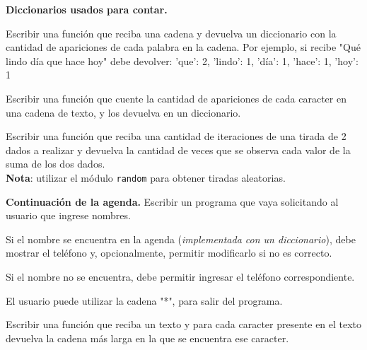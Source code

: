 \begin{ejercicio}
{\bf Diccionarios usados para contar.}
\begin{partes}
  \item Escribir una función que reciba una cadena y devuelva un diccionario con
la cantidad de apariciones de cada palabra en la cadena.  Por ejemplo, si
recibe "Qué lindo día que hace hoy" debe devolver: { 'que': 2, 'lindo': 1,
'día': 1, 'hace': 1, 'hoy': 1}
  \item Escribir una función que cuente la cantidad de apariciones de cada
caracter en una cadena de texto, y los devuelva en un diccionario.
  \item Escribir una función que reciba una cantidad de iteraciones de una tirada
de 2 dados a realizar y devuelva la cantidad de veces que se observa cada valor
de la suma de los dos dados. \\
{\bf Nota}: utilizar el módulo \verb!random! para obtener tiradas aleatorias.
\end{partes}
\end{ejercicio}

\begin{ejercicio}
{\bf Continuación de la agenda.}
Escribir un programa que vaya solicitando al usuario que ingrese nombres.
\begin{partes}
  \item Si el nombre se encuentra en la agenda ({\it implementada con un
diccionario}), debe mostrar el teléfono y, opcionalmente, permitir
modificarlo si no es correcto.
  \item Si el nombre no se encuentra, debe permitir ingresar el teléfono
correspondiente.
\end{partes}
El usuario puede utilizar la cadena "*", para salir del programa.
\end{ejercicio}

\begin{ejercicio}
Escribir una función que reciba un texto y para cada caracter presente en el
texto devuelva la cadena más larga en la que se encuentra ese caracter.
\end{ejercicio}

